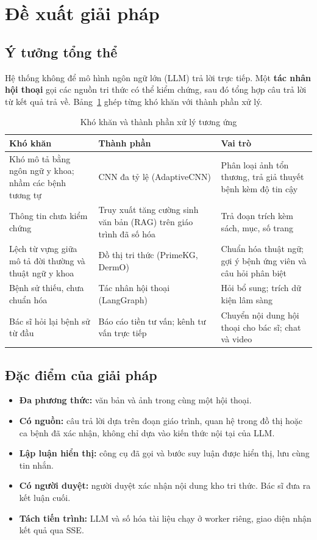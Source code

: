 \section{Đề xuất giải pháp}

\subsection{Ý tưởng tổng thể}

Hệ thống không để mô hình ngôn ngữ lớn (LLM) trả lời trực tiếp. Một \textbf{tác nhân hội thoại} gọi các nguồn tri thức có thể kiểm chứng, sau đó tổng hợp câu trả lời từ kết quả trả về. Bảng~\ref{tab:giai-phap} ghép từng khó khăn với thành phần xử lý.

\begin{table}[H]
\centering
\caption{Khó khăn và thành phần xử lý tương ứng}
\label{tab:giai-phap}
\small
\begin{tabular}{|p{4.2cm}|p{4.3cm}|p{5.2cm}|}
\hline
\textbf{Khó khăn} & \textbf{Thành phần} & \textbf{Vai trò} \\ \hline
Khó mô tả bằng ngôn ngữ y khoa; nhầm các bệnh tương tự & CNN đa tỷ lệ (AdaptiveCNN) & Phân loại ảnh tổn thương, trả giả thuyết bệnh kèm độ tin cậy \\ \hline
Thông tin chưa kiểm chứng & Truy xuất tăng cường sinh văn bản (RAG) trên giáo trình đã số hóa & Trả đoạn trích kèm sách, mục, số trang \\ \hline
Lệch từ vựng giữa mô tả đời thường và thuật ngữ y khoa & Đồ thị tri thức (PrimeKG, DermO) & Chuẩn hóa thuật ngữ; gợi ý bệnh ứng viên và câu hỏi phân biệt \\ \hline
Bệnh sử thiếu, chưa chuẩn hóa & Tác nhân hội thoại (LangGraph) & Hỏi bổ sung; trích dữ kiện lâm sàng \\ \hline
Bác sĩ hỏi lại bệnh sử từ đầu & Báo cáo tiền tư vấn; kênh tư vấn trực tiếp & Chuyển nội dung hội thoại cho bác sĩ; chat và video \\ \hline
\end{tabular}
\end{table}

\subsection{Đặc điểm của giải pháp}

\begin{itemize}
  \item \textbf{Đa phương thức:} văn bản và ảnh trong cùng một hội thoại.
  \item \textbf{Có nguồn:} câu trả lời dựa trên đoạn giáo trình, quan hệ trong đồ thị hoặc ca bệnh đã xác nhận, không chỉ dựa vào kiến thức nội tại của LLM.
  \item \textbf{Lập luận hiển thị:} công cụ đã gọi và bước suy luận được hiển thị, lưu cùng tin nhắn.
  \item \textbf{Có người duyệt:} người duyệt xác nhận nội dung kho tri thức. Bác sĩ đưa ra kết luận cuối.
  \item \textbf{Tách tiến trình:} LLM và số hóa tài liệu chạy ở worker riêng, giao diện nhận kết quả qua SSE.
\end{itemize}

